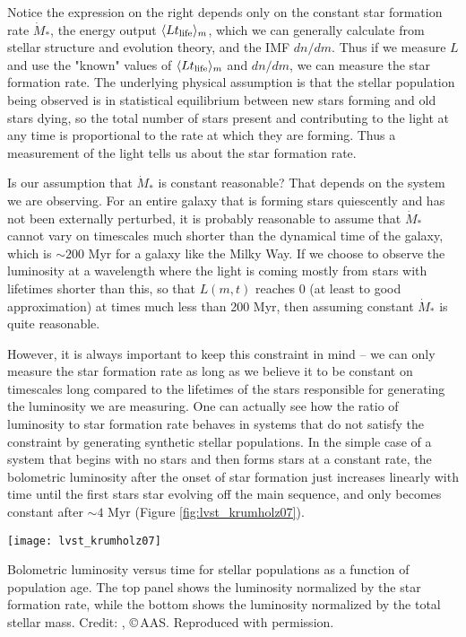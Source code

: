 Notice the expression on the right depends only on the constant star formation rate $\dot{M}_*$, the energy output $\langle L t_{\rm life}\rangle_m$, which we can generally calculate from stellar structure and evolution theory, and the IMF $dn/dm$. Thus if we measure $L$ and use the "known" values of  $\langle L t_{\rm life}\rangle_m$ and $dn/dm$, we can measure the star formation rate. The underlying physical assumption is that the stellar population being observed is in statistical equilibrium between new stars forming and old stars dying, so the total number of stars present and contributing to the light at any time is proportional to the rate at which they are forming. Thus a measurement of the light tells us about the star formation rate.

Is our assumption that $\dot{M}_*$ is constant reasonable? That depends on the system we are observing. For an entire galaxy that is forming stars quiescently and has not been externally perturbed, it is probably reasonable to assume that $\dot{M}_*$ cannot vary on timescales much shorter than the dynamical time of the galaxy, which is $\sim 200$ Myr for a galaxy like the Milky Way. If we choose to observe the luminosity at a wavelength where the light is coming mostly from stars with lifetimes shorter than this, so that $L(m,t)$ reaches 0 (at least to good approximation) at times much less than 200 Myr, then assuming constant $\dot{M}_*$ is quite reasonable.

However, it is always important to keep this constraint in mind -- we can only measure the star formation rate as long as we believe it to be constant on timescales long compared to the lifetimes of the stars responsible for generating the luminosity we are measuring. One can actually see how the ratio of luminosity to star formation rate behaves in systems that do not satisfy the constraint by generating synthetic stellar populations. In the simple case of a system that begins with no stars and then forms stars at a constant rate, the bolometric luminosity after the onset of star formation just increases linearly with time until the first stars star evolving off the main sequence, and only becomes constant after $\sim 4$ Myr (Figure \ref{fig:lvst_krumholz07}).

\begin{marginfigure}
\texttt{[image: lvst\_krumholz07]}
\caption[Bolometric luminosity versus stellar population age]{
\label{fig:lvst_krumholz07}
Bolometric luminosity versus time for stellar populations as a function of population age. The top panel shows the luminosity normalized by the star formation rate, while the bottom shows the luminosity normalized by the total stellar mass. Credit: \citet{krumholz07e}, \copyright\,AAS. Reproduced with permission.
}
\end{marginfigure}

